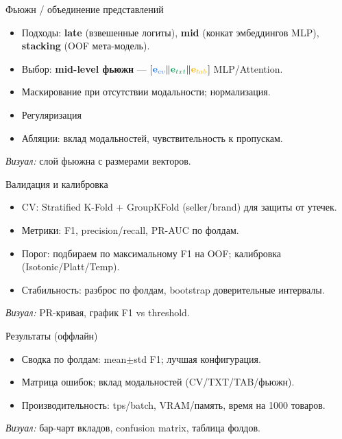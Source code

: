 \documentclass[aspectratio=169,10pt]{beamer}
\newcommand{\cv}[1]{\textcolor{CVColor}{#1}}
\newcommand{\nlp}[1]{\textcolor{NLPColor}{#1}}
\newcommand{\tabmod}[1]{\textcolor{TABColor}{#1}}
\begin{document}
\begin{frame}{Фьюжн / объединение представлений}
\begin{itemize}
  \item Подходы: \textbf{late} (взвешенные логиты), \textbf{mid} (конкат эмбеддингов \textrightarrow{} MLP), \textbf{stacking} (OOF \textrightarrow{} мета-модель).
  \item Выбор: \textbf{mid-level фьюжн} — [$\cv{\mathbf{e}_{cv}} \| \nlp{\mathbf{e}_{txt}} \| \tabmod{\mathbf{e}_{tab}}$] \textrightarrow{} MLP/Attention.
  \item Маскирование при отсутствии модальности; нормализация.
  \item Регуляризация
  \item Абляции: вклад модальностей, чувствительность к пропускам.
\end{itemize}
\medskip
\textit{Визуал:} слой фьюжна с размерами векторов.
\end{frame}

\begin{frame}{Валидация и калибровка}
\begin{itemize}
  \item CV: Stratified K-Fold + GroupKFold (seller/brand) для защиты от утечек.
  \item Метрики: F1, precision/recall, PR-AUC по фолдам.
  \item Порог: подбираем по максимальному F1 на OOF; калибровка (Isotonic/Platt/Temp).
  \item Стабильность: разброс по фолдам, bootstrap доверительные интервалы.
\end{itemize}
\medskip
\textit{Визуал:} PR-кривая, график F1 vs threshold.
\end{frame}

\begin{frame}{Результаты (оффлайн)}
\begin{itemize}
  \item Сводка по фолдам: mean$\pm$std F1; лучшая конфигурация.
  \item Матрица ошибок; вклад модальностей (CV/TXT/TAB/фьюжн).
  \item Производительность: tps/batch, VRAM/память, время на 1000 товаров.
\end{itemize}
\medskip
\textit{Визуал:} бар-чарт вкладов, confusion matrix, таблица фолдов.
\end{frame}
\end{document}

